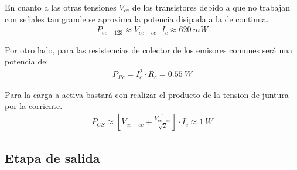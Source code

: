 En cuanto a las otras tensiones $V_{ce}$ de los transistores debido a que no trabajan con señales tan grande se aproxima la potencia disipada a la de continua.
\begin{align}
P_{ec-123}\approx V_{ce-cc} \cdot I_c \approx 620 \ mW
\end{align}

Por otro lado, para las resistencias de colector de los emisores comunes será una potencia de:
\begin{align}
P_{Rc}= I_c^2 \cdot R_c= 0.55 \ W
\end{align}

Para la carga a activa bastará con realizar el producto de la tension de juntura por la corriente.
\begin{align}
P_{CS}\approx\left[V_{ce-cc} + \frac{\hat{V_{ce-ac}}}{\sqrt{2}}\right]\cdot I_c\approx 1 \ W
\end{align}
 

\subsection{Etapa de salida}

%

